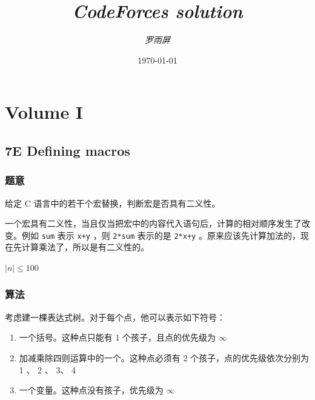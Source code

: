 \documentclass[11pt]{article}
\title{\emph{CodeForces solution}}
\author{\emph{罗雨屏}}
\date{\today}
\begin{document}
\maketitle

\setcounter{tocdepth}{2}
\tableofcontents
\vspace*{1cm}

\newcommand{\and}{\hspace{0.1cm} \textbf{and} \hspace{0.1cm}}
\newcommand{\xor}{\hspace{0.1cm} \textbf{xor} \hspace{0.1cm}}
\newcommand{\floor}[ 1]{{\lfloor #1 \rfloor}}
\newcommand{\ceil}[ 1]{{\lceil #1 \rceil}}
\newtheorem{improve}{优化}
\newtheorem{theorem}{定理}
\newtheorem{proof}{证明}
\newtheorem{problem}{问题}
\newtheorem{definition}{定义}

\section{Volume I}
\label{sec-1}
\subsection{7E    Defining macros}
\label{sec-1-1}
\subsubsection{题意}
\label{sec-1-1-1}

    给定 C 语言中的若干个宏替换，判断宏是否具有二义性。

    一个宏具有二义性，当且仅当把宏中的内容代入语句后，计算的相对顺序发生了改变。例如 \texttt{sum} 表示 \texttt{x+y} ，则 \texttt{2*sum} 表示的是 \texttt{2*x+y} 。原来应该先计算加法的，现在先计算乘法了，所以是有二义性的。

    $|n| \leq 100$
\subsubsection{算法}
\label{sec-1-1-2}

    考虑建一棵表达式树。对于每个点，他可以表示如下符号：
\begin{enumerate}
\item 一个括号。这种点只能有 1 个孩子，且点的优先级为 $\infty$
\item 加减乘除四则运算中的一个。这种点必须有 2 个孩子，点的优先级依次分别为 1 、 2 、 3、 4
\item 一个变量。这种点没有孩子，优先级为 $\infty$
\end{enumerate}
\end{document}
